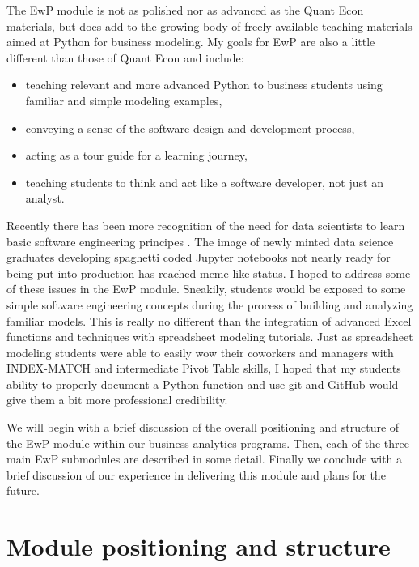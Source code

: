 \documentclass[ited,blindrev]{informs3}              %
\begin{document}
The EwP module is not as polished nor as advanced as the Quant Econ materials, but does add to the growing body of freely available teaching materials aimed at Python for business modeling. My goals for EwP are also a little different than those of Quant Econ and include:

\begin{itemize}
	\item teaching relevant and more advanced Python to business students using familiar and simple modeling examples,
	\item conveying a sense of the software design and development process,
	\item acting as a tour guide for a learning journey,
	\item teaching students to think and act like a software developer, not just an analyst.
\end{itemize}

Recently there has been more recognition of the need for data scientists to learn basic software engineering principes \cite{SoftwareEngineeringData,SoftwareEngineeringDataa,BuildingReproducibleAnalytical}.  The image of newly minted data science graduates developing spaghetti coded Jupyter notebooks not nearly ready for being put into production has reached \href{https://www.reddit.com/r/ProgrammerHumor/comments/y2xe3n/like_every_time_ever_when_the_devops_engineer/}{meme like status}. I hoped to address some of these issues in the EwP module. Sneakily, students would be exposed to some simple software engineering concepts during the process of building and analyzing familiar models. This is really no different than the integration of advanced Excel functions and techniques with spreadsheet modeling tutorials. Just as spreadsheet modeling students were able to easily wow their coworkers and managers with INDEX-MATCH and intermediate Pivot Table skills, I hoped that my students ability to properly document a Python function and use git and GitHub would give them a bit more professional credibility.

We will begin with a brief discussion of the overall positioning and structure of the EwP module within our business analytics programs. Then, each of the three main EwP submodules are described in some detail. Finally we conclude with a brief discussion of our experience in delivering this module and plans for the future.

\section{Module positioning and structure}
\end{document}
